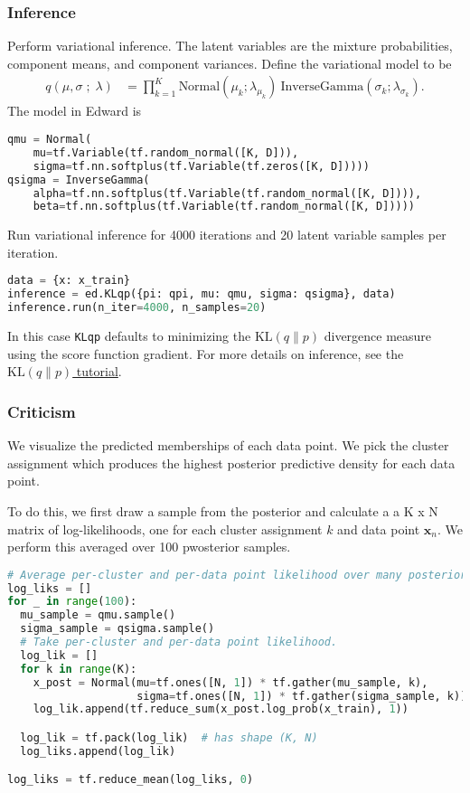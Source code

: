 \subsubsection{Inference}
Perform variational inference.
%
The latent variables are the mixture probabilities,
component means, and component variances.
Define the variational model to be
\begin{align*}
 q(\mu, \sigma \;;\; \lambda)
 &=
 \prod_{k=1}^K
 \text{Normal}(\mu_k; \lambda_{\mu_k})
 ~
 \text{InverseGamma}(\sigma_k; \lambda_{\sigma_k}).
\end{align*}
The model in Edward is
\begin{lstlisting}[language=Python]
qmu = Normal(
    mu=tf.Variable(tf.random_normal([K, D])),
    sigma=tf.nn.softplus(tf.Variable(tf.zeros([K, D]))))
qsigma = InverseGamma(
    alpha=tf.nn.softplus(tf.Variable(tf.random_normal([K, D]))),
    beta=tf.nn.softplus(tf.Variable(tf.random_normal([K, D]))))
\end{lstlisting}

Run variational inference for 4000 iterations and 20 latent variable
samples per iteration.
\begin{lstlisting}[language=Python]
data = {x: x_train}
inference = ed.KLqp({pi: qpi, mu: qmu, sigma: qsigma}, data)
inference.run(n_iter=4000, n_samples=20)
\end{lstlisting}
In this case
\texttt{KLqp} defaults to minimizing the
$\text{KL}(q\|p)$ divergence measure using the score function
gradient.
For more details on inference, see the \href{/tutorials/klqp}{$\text{KL}(q\|p)$ tutorial}.


\subsubsection{Criticism}

We visualize the predicted memberships of each data point.
We pick the cluster assignment which produces
the highest posterior predictive density for each data point.

To do this, we first draw a sample from the posterior and calculate a
a K x N matrix of log-likelihoods, one for each cluster assignment $k$
and data point $\mathbf{x}_n$. We perform this averaged over 100
pwosterior samples.
\begin{lstlisting}[language=Python]
# Average per-cluster and per-data point likelihood over many posterior samples.
log_liks = []
for _ in range(100):
  mu_sample = qmu.sample()
  sigma_sample = qsigma.sample()
  # Take per-cluster and per-data point likelihood.
  log_lik = []
  for k in range(K):
    x_post = Normal(mu=tf.ones([N, 1]) * tf.gather(mu_sample, k),
                    sigma=tf.ones([N, 1]) * tf.gather(sigma_sample, k))
    log_lik.append(tf.reduce_sum(x_post.log_prob(x_train), 1))

  log_lik = tf.pack(log_lik)  # has shape (K, N)
  log_liks.append(log_lik)

log_liks = tf.reduce_mean(log_liks, 0)
\end{lstlisting}

